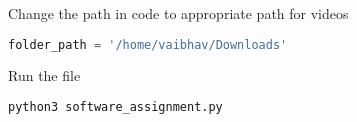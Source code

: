 \documentclass[journal,12pt,twocolumn]{IEEEtran}
\begin{document}
Change the path in code to appropriate path for videos

\begin{mdframed}[style=codebox]
\lstset{style=mystyle}
\begin{lstlisting}[language=Python]
    folder_path = '/home/vaibhav/Downloads'
\end{lstlisting}
\end{mdframed}

Run the file


\begin{mdframed}[style=codebox]
\lstset{style=mystyle}
\begin{lstlisting}[language=Python]
    python3 software_assignment.py
\end{lstlisting}
\end{mdframed}
\end{document}
